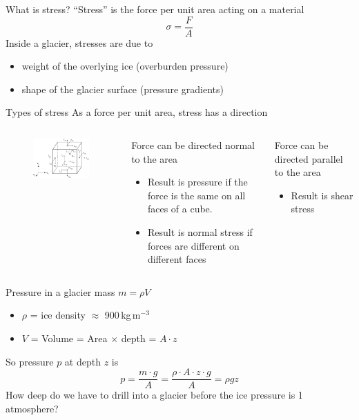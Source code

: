 \documentclass[hide notes,intlimits,unknownkeysallowed]{beamer}
\begin{document}
\begin{frame}{What is stress?}
  ``Stress'' is the force per unit area acting on a material
  \begin{displaymath}
    \sigma = \frac{F}{A}
  \end{displaymath}
  Inside a glacier, stresses are due to
  \begin{itemize}
  \item weight of the overlying ice (overburden pressure)
  \item shape of the glacier surface (pressure gradients)
  \end{itemize}
\end{frame}


\begin{frame}{Types of stress}
  As a force per unit area, stress has a direction
  \begin{columns}
    \column[c]{5cm}
    \begin{figure}
      \includegraphics[width=4.75cm]{figures/fig_3_08}
    \end{figure}
    \column[c]{6.5cm}
   \begin{block}{}
      Force can be directed normal to the area
      \begin{itemize}
      \item Result is \alert{pressure} if the force is the same on all faces of a cube.
      \item Result is \alert{normal stress} if forces are different on different faces
      \end{itemize}
    \end{block}
    \begin{block}{} 
      Force can be directed parallel to the area
      \begin{itemize}
      \item Result is \alert{shear stress}
      \end{itemize}
    \end{block}
  \end{columns}
\end{frame}

\begin{frame}{Pressure in a glacier}
  mass $m = \rho V$
     \begin{itemize}
      \item $\rho$ = ice density $\approx$ 900\,kg\,m$^{-3}$
      \item$V$ = Volume = Area $\times$ depth = $A \cdot z$
     \end{itemize}
     So pressure $p$ at depth $z$ is
     \begin{displaymath}
       p = \frac{m \cdot g}{A} = \frac{\rho \cdot A \cdot z \cdot g}{A} = \rho g z
     \end{displaymath}
     How deep do we have to drill into a glacier before the ice pressure is 1 atmosphere?
\end{frame}
\end{document}
